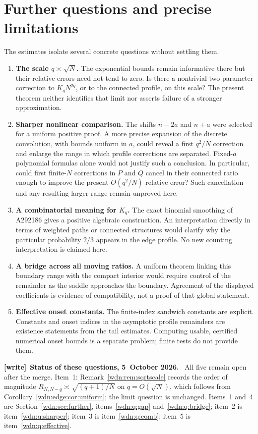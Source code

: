 \documentclass[11pt,letterpaper]{article}
\theoremstyle{remark}\newtheorem{remark}[theorem]{Remark}
\newenvironment{writenote}[1][]{\par\smallskip\begingroup\small
 \noindent\textbf{[write]}\if\relax\detokenize{#1}\relax\else~\textbf{#1.}\fi\ }%
 {\par\endgroup\smallskip}
\begin{document}
\section{Further questions and precise limitations}\label{wdn:edge:sec:future}
The estimates isolate several concrete questions without settling them.
\begin{enumerate}
\item \textbf{The scale $q\asymp\sqrt N$.}
The exponential bounds remain informative there but their relative
errors need not tend to zero. Is there a nontrivial two-parameter
correction to $K_qN^{2q}$, or to the connected profile, on this scale?
The present theorem neither identifies that limit nor asserts failure
of a stronger approximation.
\item \textbf{Sharper nonlinear comparison.}
The shifts $n-2a$ and $n+a$ were selected for a uniform positive proof.
A more precise expansion of the discrete convolution, with bounds
uniform in $a$, could reveal a first $q^2/N$ correction and enlarge the
range in which profile corrections are separated. Fixed-$a$ polynomial
formulas alone would not justify such a conclusion. In particular, could
first finite-$N$ corrections in $P$ and $Q$ cancel in their connected
ratio enough to improve the present $O(q^2/N)$ relative error? Such
cancellation and any resulting larger range remain unproved here.
\item \textbf{A combinatorial meaning for $K_q$.}
The exact binomial smoothing of A292186 gives a positive algebraic
construction. An interpretation directly in terms of weighted paths
or connected structures would clarify why the particular probability
$2/3$ appears in the edge profile. No new counting interpretation is
claimed here.
\item \textbf{A bridge across all moving ratios.}
A uniform theorem linking this boundary range with the compact interior
would require control of the remainder as the saddle approaches the
boundary. Agreement of the displayed coefficients is evidence of
compatibility, not a proof of that global statement.
\item \textbf{Effective onset constants.}
The finite-index sandwich constants are explicit. Constants and onset
indices in the asymptotic profile remainders are existence statements
from the tail estimates. Computing usable, certified numerical onset
bounds is a separate problem; finite tests do not provide them.
\end{enumerate}

\begin{writenote}[Status of these questions, 5~October 2026]
All five remain open after the merge. Item~1: Remark~\ref{wdn:rem:sqrtscale} records the order of magnitude $R_{N,N-q}\asymp\sqrt{(q+1)/N}$ on $q=O(\sqrt N)$, which follows from Corollary~\ref{wdn:edge:cor:uniform}; the limit question is unchanged. Items~1 and~4 are Section~\ref{wdn:sec:further}, items~\ref{wdn:q:gap} and~\ref{wdn:q:bridge}; item~2 is item~\ref{wdn:q:sharper}; item~3 is item~\ref{wdn:q:comb}; item~5 is item~\ref{wdn:q:effective}.
\end{writenote}
\end{document}
